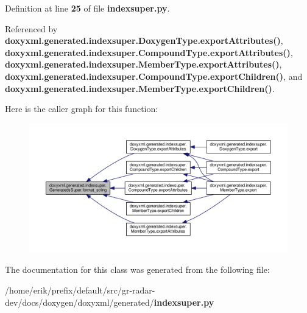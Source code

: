 Definition at line {\bf 25} of file {\bf indexsuper.\+py}.



Referenced by {\bf doxyxml.\+generated.\+indexsuper.\+Doxygen\+Type.\+export\+Attributes()}, {\bf doxyxml.\+generated.\+indexsuper.\+Compound\+Type.\+export\+Attributes()}, {\bf doxyxml.\+generated.\+indexsuper.\+Member\+Type.\+export\+Attributes()}, {\bf doxyxml.\+generated.\+indexsuper.\+Compound\+Type.\+export\+Children()}, and {\bf doxyxml.\+generated.\+indexsuper.\+Member\+Type.\+export\+Children()}.



Here is the caller graph for this function\+:
\nopagebreak
\begin{figure}[H]
\begin{center}
\leavevmode
\includegraphics[width=350pt]{d5/d1f/classdoxyxml_1_1generated_1_1indexsuper_1_1GeneratedsSuper_a88d3ecd1f60734f3b7383dbb4f5a359d_icgraph}
\end{center}
\end{figure}




The documentation for this class was generated from the following file\+:\begin{DoxyCompactItemize}
\item 
/home/erik/prefix/default/src/gr-\/radar-\/dev/docs/doxygen/doxyxml/generated/{\bf indexsuper.\+py}\end{DoxyCompactItemize}
